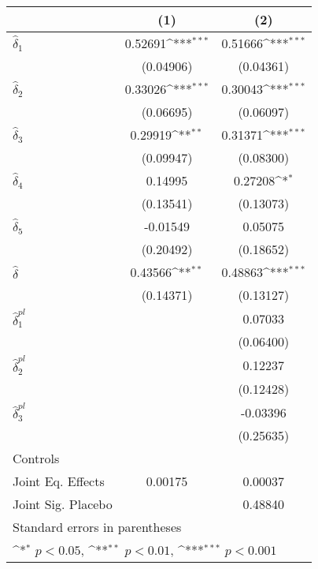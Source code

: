\documentclass[varwidth]{standalone}
\begin{document}
{
\def\sym#1{\ifmmode^{#1}\else\(^{#1}\)\fi}
\begin{tabular}{l*{2}{c}}
\toprule
            &\multicolumn{1}{c}{(1)}         &\multicolumn{1}{c}{(2)}         \\
\midrule
$\hat{\delta}_1$&     0.52691\sym{***}&     0.51666\sym{***}\\
            &   (0.04906)         &   (0.04361)         \\
\addlinespace
$\hat{\delta}_2$&     0.33026\sym{***}&     0.30043\sym{***}\\
            &   (0.06695)         &   (0.06097)         \\
\addlinespace
$\hat{\delta}_3$&     0.29919\sym{**} &     0.31371\sym{***}\\
            &   (0.09947)         &   (0.08300)         \\
\addlinespace
$\hat{\delta}_4$&     0.14995         &     0.27208\sym{*}  \\
            &   (0.13541)         &   (0.13073)         \\
\addlinespace
$\hat{\delta}_5$&    -0.01549         &     0.05075         \\
            &   (0.20492)         &   (0.18652)         \\
\addlinespace
$\hat{\delta}$&     0.43566\sym{**} &     0.48863\sym{***}\\
            &   (0.14371)         &   (0.13127)         \\
\addlinespace
$\hat{\delta}_1^{pl}$&                     &     0.07033         \\
            &                     &   (0.06400)         \\
\addlinespace
$\hat{\delta}_2^{pl}$&                     &     0.12237         \\
            &                     &   (0.12428)         \\
\addlinespace
$\hat{\delta}_3^{pl}$&                     &    -0.03396         \\
            &                     &   (0.25635)         \\
\midrule
Controls    &                     &                     \\
Joint Eq. Effects&     0.00175         &     0.00037         \\
Joint Sig. Placebo&                     &     0.48840         \\
\bottomrule
\multicolumn{3}{l}{\footnotesize Standard errors in parentheses}\\
\multicolumn{3}{l}{\footnotesize \sym{*} \(p<0.05\), \sym{**} \(p<0.01\), \sym{***} \(p<0.001\)}\\
\end{tabular}
}
\end{document}
